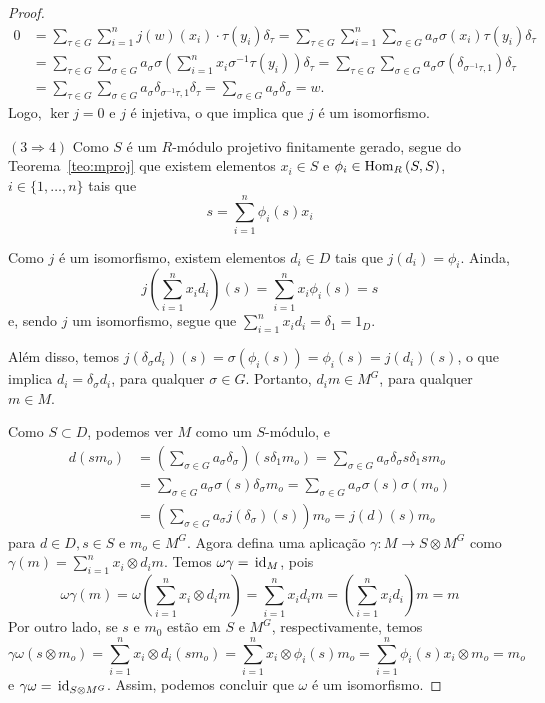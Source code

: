 \begin{teo}
\begin{proof}
\begin{align*}
        0   &= \sum_{\tau\in G}\sum_{i=1}^{n} j(w)(x_i) \cdot \tau(y_i)\delta_\tau = \sum_{\tau\in G}\sum_{i=1}^{n} \sum_{\sigma\in G}a_\sigma \sigma(x_i) \tau(y_i)\delta_\tau \\
            &= \sum_{\tau\in G} \sum_{\sigma\in G}a_\sigma \sigma\left(\sum_{i=1}^{n}x_i \sigma^{-1}\tau(y_i)\right)\delta_\tau = \sum_{\tau\in G} \sum_{\sigma\in G}a_\sigma \sigma\left(\delta_{\sigma^{-1}\tau,1}\right) \delta_\tau \\
            &= \sum_{\tau\in G} \sum_{\sigma\in G} a_\sigma \delta_{\sigma^{-1}\tau,1} \delta_\tau = \sum_{\sigma\in G} a_\sigma \delta_\sigma = w.
\end{align*}
Logo, $\ker j =0$ e $j$ é injetiva, o que implica que $j$ é um isomorfismo. \par 



$(3\Rightarrow 4)$
Como $S$ é um $R$-módulo projetivo finitamente gerado, segue do Teorema~\ref{teo:mproj} que existem elementos $x_i \in S$ e $\phi_i \in \textrm{Hom}_{R}\left( S,S \right)$, $i\in \{1,\dots,n\}$ tais que\[s=\sum_{i=1}^{n} \phi_i(s)x_i\]\par
Como $j$ é um isomorfismo, existem elementos $d_i \in D$ tais que $j(d_i)=\phi_i$. Ainda,\[j\left(\sum_{i=1}^{n} x_id_i \right)(s)=\sum_{i=1}^n x_i\phi_i(s)=s\]e, sendo $j$ um isomorfismo, segue que $\sum_{i=1}^{n}x_i d_i =\delta_1 =1_D$. \par 
Além disso, temos $j(\delta_\sigma d_i)(s) = \sigma(\phi_i(s))=\phi_i(s)=j(d_i)(s)$, o que implica $d_i=\delta_\sigma d_i$, para qualquer $\sigma\in G$. Portanto, $d_i m \in M^G$, para qualquer $m\in M$. \par Como $S \subset D$, podemos ver $M$ como um $S$-módulo, e
\begin{align*}
        d(sm_o) &= \left(\sum_{\sigma\in G}a_\sigma\delta_\sigma \right)(s\delta_1 m_o) = \sum_{\sigma\in G} a_\sigma \delta_\sigma s\delta_1 sm_o \\
                &= \sum_{\sigma\in G} a_\sigma \sigma(s)\delta_\sigma m_o = \sum_{\sigma\in G} a_\sigma \sigma(s)\sigma(m_o) \\
                &= \left(\sum_{\sigma\in G} a_\sigma j(\delta_\sigma)(s)\right)m_o = j(d)(s)m_o
\end{align*}
para $d\in D, s\in S$ e $m_o \in M^G$. Agora defina uma aplicação $\gamma: M \rightarrow S\otimes M^G$ como $\gamma (m)=\sum_{i=1}^{n}x_i \otimes d_i m$. Temos $\omega\gamma=\, \textrm{id}_{M}$, pois\[\omega\gamma(m)=\omega\left( \sum_{i=1}^{n}x_i \otimes d_i m \right) = \sum_{i=1}^{n}x_id_im= \left(\sum_{i=1}^{n}x_id_i \right) m=m\]
Por outro lado, se $s$ e $m_0$ estão em $S$ e $M^G$, respectivamente, temos\[\gamma\omega(s\otimes m_o)= \sum_{i=1}^{n} x_i \otimes d_i (sm_o) = \sum_{i=1}^{n}x_i\otimes \phi_i(s)m_o = \sum_{i=1}^{n}\phi_i(s)x_i\otimes m_o = m_o\]
e $\gamma\omega=\, \textrm{id}_{S\otimes M^G}$. Assim, podemos concluir que $\omega$ é um isomorfismo.




\end{proof}
\end{teo}
